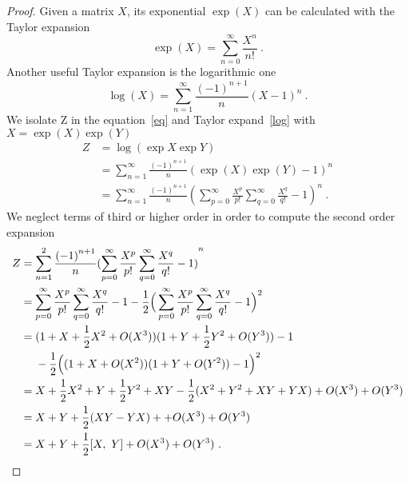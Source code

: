    \begin{proof}
        Given a matrix $X$, its exponential $\exp(X)$ can be calculated with the Taylor expansion
        \begin{equation} \label{exp}
            \exp(X) = \sum_{n=0}^{\infty} \frac{X^n}{n!} ~.
        \end{equation}
        Another useful Taylor expansion is the logarithmic one 
        \begin{equation} \label{log}
            \log(X) = \sum_{n=1}^{\infty} \frac{{(-1)}^{n+1}}{n} {(X-1)}^n ~.
        \end{equation}
        We isolate Z in the equation~\eqref{eq} and Taylor expand~\eqref{log} with $X = \exp(X)\exp(Y)$
        \begin{equation*}
        \begin{aligned}
            Z & = \log(\exp{X}\exp{Y}) \\ & = \sum_{n=1}^{\infty} \frac{{(-1)}^{n+1}}{n} {(\exp(X)\exp(Y) -1)}^n \\ & = \sum_{n=1}^{\infty} \frac{{(-1)}^{n+1}}{n} {(\sum_{p=0}^{\infty} \frac{X^p}{p!} \sum_{q=0}^{\infty} \frac{X^q}{q!} - 1)}^n ~.
        \end{aligned}
        \end{equation*}
        We neglect terms of third or higher order in order to compute the second order expansion
        \begin{equation*}
        \begin{aligned}
            Z & = \sum_{n=1}^{2} \frac{{(-1)}^{n+1}}{n} {(\sum_{p=0}^{\infty} \frac{X^p}{p!} \sum_{q=0}^{\infty} \frac{X^q}{q!} - 1)}^n \\ & = \sum_{p=0}^{\infty} \frac{X^p}{p!} \sum_{q=0}^{\infty} \frac{X^q}{q!} - 1 -\frac{1}{2} \Big(\sum_{p=0}^{\infty} \frac{X^p}{p!} \sum_{q=0}^{\infty} \frac{X^q}{q!} - 1\Big)^2 \\ & = (1 + X + \frac{1}{2} X^2 + O(X^3)) (1 + Y + \frac{1}{2} Y^2 + O(Y^3)) - 1 \\ & \quad ~ -\frac{1}{2} {\Big ((1 + X + O(X^2)) (1 + Y + O(Y^2)) - 1 \Big )}^2 \\ & = X + \frac{1}{2} X^2 + Y + \frac{1}{2} Y^2 + XY - \frac{1}{2} (X^2 + Y^2 + XY + YX) + O(X^3) + O(Y^3) \\ & = X + Y + \frac{1}{2} (XY - YX) + + O(X^3) + O(Y^3) \\ & = X + Y + \frac{1}{2} [X,~Y] + O(X^3) + O(Y^3) ~.
        \end{aligned}
        \end{equation*}
    \end{proof}

